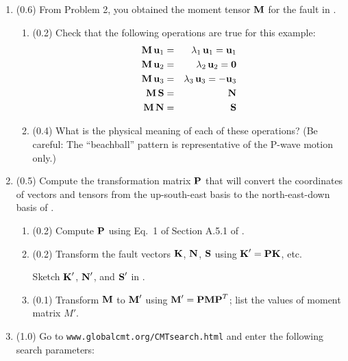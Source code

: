 \documentclass[11pt,titlepage,fleqn]{article}
\begin{document}
\begin{enumerate}

\item (0.6) From Problem 2, you obtained the moment tensor $\mbox{${\bf M}$}$ for the fault in .

\begin{enumerate}
\item (0.2) Check that the following operations are true for this example:
%
\begin{eqnarray}
\mbox{${\bf M}$} \, \mbox{${\bf u}$}_1 &=& \lambda_1 \, \mbox{${\bf u}$}_1 = \mbox{${\bf u}$}_1
\\
\mbox{${\bf M}$} \, \mbox{${\bf u}$}_2 &=& \lambda_2 \, \mbox{${\bf u}$}_2 = \mbox{${\bf 0}$}
\\
\mbox{${\bf M}$} \, \mbox{${\bf u}$}_3 &=& \lambda_3 \, \mbox{${\bf u}$}_3 = -\mbox{${\bf u}$}_3
\\
\mbox{${\bf M}$} \, \mbox{${\bf S}$} &=& \mbox{${\bf N}$}
\\
\mbox{${\bf M}$} \, \mbox{${\bf N}$} &=& \mbox{${\bf S}$}
\end{eqnarray}

\item (0.4) What is the physical meaning of each of these operations? (Be careful: The ``beachball'' pattern is representative of the P-wave motion only.)

\end{enumerate}


\item (0.5) Compute the transformation matrix $\mbox{${\bf P}$}$ that will convert the coordinates of vectors and tensors from the up-south-east basis to the north-east-down basis of \citet{AkiRichardsE2}.
%
\begin{enumerate}
\item (0.2) Compute $\mbox{${\bf P}$}$ using Eq.~1 of Section A.5.1 of \cite{SteinWysession}.

\item (0.2) Transform the fault vectors $\mbox{${\bf K}$}$, $\mbox{${\bf N}$}$, $\mbox{${\bf S}$}$ using $\mbox{${\bf K}$}' = \mbox{${\bf P}$}\mbox{${\bf K}$}$, etc.

Sketch $\mbox{${\bf K}$}'$, $\mbox{${\bf N}$}'$, and $\mbox{${\bf S}$}'$ in .

\item (0.1) Transform $\mbox{${\bf M}$}$ to $\mbox{${\bf M}$}'$ using $\mbox{${\bf M}$}' = \mbox{${\bf P}$} \mbox{${\bf M}$} \mbox{${\bf P}$}^T$; list the values of moment matrix $M'$.
\end{enumerate}


\item (1.0) Go to \verb+www.globalcmt.org/CMTsearch.html+ and enter the following search parameters:


\end{enumerate}
\end{document}
